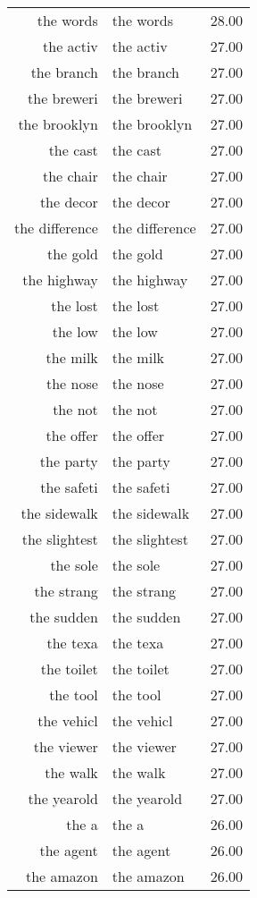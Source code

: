 \begin{table}[ht]
\begin{tabular}{rlr}
  the words & the words & 28.00 \\ 
  the activ & the activ & 27.00 \\ 
  the branch & the branch & 27.00 \\ 
  the breweri & the breweri & 27.00 \\ 
  the brooklyn & the brooklyn & 27.00 \\ 
  the cast & the cast & 27.00 \\ 
  the chair & the chair & 27.00 \\ 
  the decor & the decor & 27.00 \\ 
  the difference & the difference & 27.00 \\ 
  the gold & the gold & 27.00 \\ 
  the highway & the highway & 27.00 \\ 
  the lost & the lost & 27.00 \\ 
  the low & the low & 27.00 \\ 
  the milk & the milk & 27.00 \\ 
  the nose & the nose & 27.00 \\ 
  the not & the not & 27.00 \\ 
  the offer & the offer & 27.00 \\ 
  the party & the party & 27.00 \\ 
  the safeti & the safeti & 27.00 \\ 
  the sidewalk & the sidewalk & 27.00 \\ 
  the slightest & the slightest & 27.00 \\ 
  the sole & the sole & 27.00 \\ 
  the strang & the strang & 27.00 \\ 
  the sudden & the sudden & 27.00 \\ 
  the texa & the texa & 27.00 \\ 
  the toilet & the toilet & 27.00 \\ 
  the tool & the tool & 27.00 \\ 
  the vehicl & the vehicl & 27.00 \\ 
  the viewer & the viewer & 27.00 \\ 
  the walk & the walk & 27.00 \\ 
  the yearold & the yearold & 27.00 \\ 
  the a & the a & 26.00 \\ 
  the agent & the agent & 26.00 \\ 
  the amazon & the amazon & 26.00 \\ 

\end{tabular}
\end{table}
